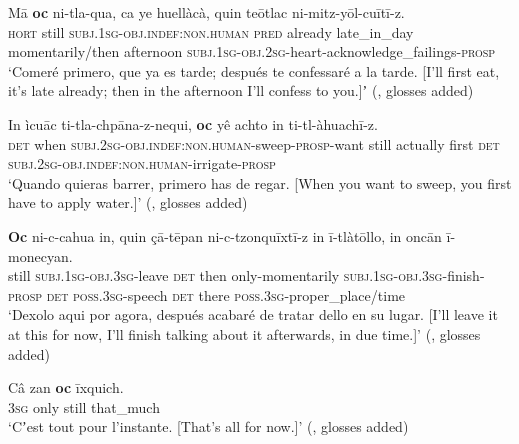 \begin{exe}
	\ex\label{exAppendixclassicalNahuatlFirstforNow1}
	\gll Mā \textbf{oc} ni-tla-qua, ca ye huellàcà, quin teōtlac ni-mitz-yōl-cuītī-z.\\
	\textsc{hort} still \textsc{subj}.1\textsc{sg}-\textsc{obj}.\textsc{indef}:\textsc{non}.\textsc{human} \textsc{pred} already late\_in\_day momentarily/then afternoon \textsc{subj}.1\textsc{sg}-\textsc{obj}.2\textsc{sg}-heart-acknowledge\_failings-\textsc{prosp}\\
	\glt \lq Comeré primero, que ya es tarde; después te confessaré a la tarde. [I’ll first eat, it’s late already; then in the afternoon I’ll confess to you.]ʼ (\cite[502]{Carochi1645}, glosses added)

	\ex\label{exAppendixclassicalNahuatlFirstforNow2}
	\gll In ìcuāc ti-tla-chpāna-z-nequi, \textbf{oc} yê achto in ti-tl-àhuachī-z.\\
	\textsc{det} when \textsc{subj}.2\textsc{sg}-\textsc{obj}.\textsc{indef}:\textsc{non}.\textsc{human}-sweep-\textsc{prosp}-want still actually first \textsc{det} \textsc{subj}.2\textsc{sg}-\textsc{obj}.\textsc{indef}:\textsc{non}.\textsc{human}-irrigate-\textsc{prosp}\\
	\glt \lq Quando quieras barrer, primero has de regar. [When you want to sweep, you first have to apply water.]\rq{ }(\cite[502]{Carochi1645}, glosses added)

	\ex\label{exAppendixclassicalNahuatlFirstforNow3}
	\gll \textbf{Oc} ni-c-cahua in, quin çā-tēpan ni-c-tzonquīxtī-z in ī-tlàtōllo, in oncān ī-monecyan.\\
	still \textsc{subj}.1\textsc{sg}-\textsc{obj}.3\textsc{sg}-leave \textsc{det} then only-momentarily \textsc{subj}.1\textsc{sg}-\textsc{obj}.3\textsc{sg}-finish-\textsc{prosp} \textsc{det} \textsc{poss}.3\textsc{sg}-speech \textsc{det} there \textsc{poss}.3\textsc{sg}-proper\_place/time\\
	\glt \lq Dexolo aqui por agora, después acabaré de tratar dello en su lugar. [I’ll leave it at this for now, I’ll finish talking about it afterwards, in due time.]\rq{ }(\cite[500]{Carochi1645}, glosses added)

	\ex
	\gll Câ zan \textbf{oc} īxquich.\\
	3\textsc{sg} only still that\_much\\
	\glt \lq Cʼest tout pour l'instante. [That's all for now.]\rq{ }(\cite[1263]{Launey1986}, glosses added)
\end{exe}


